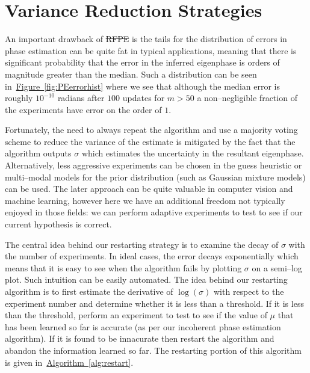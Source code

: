 \documentclass[aps,pra,amsmath,twocolumn,amssymb,superscriptaddress]{revtex4-1}
\newcommand{\fig}[1]{\hyperref[fig:#1]{Figure~\ref*{fig:#1}}}
\newcommand{\alg}[1]{\hyperref[alg:#1]{Algorithm~\ref*{alg:#1}}}
\providecommand{\DIFaddtex}[1]{{\protect\color{blue}\uwave{#1}}} %
\providecommand{\DIFdeltex}[1]{{\protect\color{red}\sout{#1}}}                      %
\providecommand{\DIFaddbegin}{} %
\providecommand{\DIFaddend}{} %
\providecommand{\DIFdelbegin}{} %
\providecommand{\DIFdelend}{} %
\providecommand{\DIFadd}[1]{\texorpdfstring{\DIFaddtex{#1}}{#1}} %
\providecommand{\DIFdel}[1]{\texorpdfstring{\DIFdeltex{#1}}{}} %
\begin{document}
\DIFaddend %
% 

\pagebreak
\appendix


\onecolumngrid

\section{Variance Reduction Strategies}
\DIFaddbegin \label{app:var-reduction}
\DIFaddend %

An important drawback of \DIFdelbegin %
\DIFdel{RFPE }%
\DIFdelend \DIFaddbegin \DIFadd{RFPE }\DIFaddend is  the tails for the distribution of errors in phase estimation can be quite fat in typical applications, meaning that there is significant probability that the error in the inferred eigenphase is orders of magnitude greater than the median.  Such a distribution can be seen in~\fig{PEerrorhist} where we see that although the median error is roughly $10^{-10}$ radians after $100$ updates for $m>50$  a non--negligible fraction of the experiments have error on the order of $1$.    

Fortunately, the need to always repeat the algorithm and use a majority voting scheme to reduce the variance of the estimate is mitigated by the fact that the algorithm outputs $\sigma$ which estimates the uncertainty in the resultant eigenphase. 
Alternatively, less aggressive experiments can be chosen in the guess heuristic or multi--modal models for the prior distribution (such as Gaussian mixture models) can be used.  The later approach can be quite valuable in computer vision and machine learning, however here we have an additional freedom not typically enjoyed in those fields: we can perform adaptive experiments to test to see if our current hypothesis is correct.

The central idea behind our restarting strategy is to examine the decay of $\sigma$ with the number of experiments.  In ideal cases, the error decays exponentially which means that it is easy to see when the algorithm fails by plotting $\sigma$ on a semi--log plot.  Such intuition can be easily automated.  The idea behind our restarting algorithm is to first estimate the derivative of $\log(\sigma)$ with respect to the experiment number and determine whether it is less than a threshold.  If it is less than the threshold, perform an experiment to test to see if the value of $\mu$ that has been learned so far is accurate (as per our incoherent phase estimation algorithm).  If it is found to be innacurate then restart the algorithm and abandon the information learned so far.  The restarting portion of this algorithm is given in~\alg{restart}.
\end{document}
